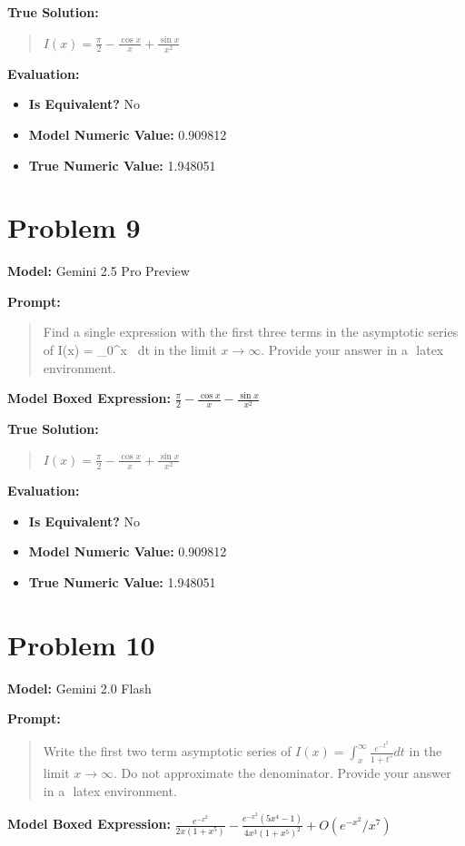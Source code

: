 \documentclass{article}
\begin{document}
\textbf{True Solution:}
\begin{quote}
$I(x)=\frac{\pi}{2} - \frac{\cos x}{x} + \frac{\sin x}{x^2}$
\end{quote}

\textbf{Evaluation:}
\begin{itemize}
\item \textbf{Is Equivalent?} No
\item \textbf{Model Numeric Value:} 0.909812
\item \textbf{True Numeric Value:} 1.948051
\end{itemize}
\vspace{1cm}
\section*{Problem 9}
\textbf{Model:} Gemini 2.5 Pro Preview

\textbf{Prompt:}
\begin{quote}
Find a single expression with the first three terms in the asymptotic series of I(x) = \int\limits_{0}^{x}  \ dt in the limit $x \to \infty$. Provide your answer in a $\boxed{}$ latex environment.
\end{quote}
\textbf{Model Boxed Expression:} $\frac{\pi}{2} - \frac{\cos x}{x} - \frac{\sin x}{x^2}$

\textbf{True Solution:}
\begin{quote}
$I(x)=\frac{\pi}{2} - \frac{\cos x}{x} + \frac{\sin x}{x^2}$
\end{quote}

\textbf{Evaluation:}
\begin{itemize}
\item \textbf{Is Equivalent?} No
\item \textbf{Model Numeric Value:} 0.909812
\item \textbf{True Numeric Value:} 1.948051
\end{itemize}
\vspace{1cm}
\section*{Problem 10}
\textbf{Model:} Gemini 2.0 Flash

\textbf{Prompt:}
\begin{quote}
Write the first two term asymptotic series of $I(x) = \int^\infty_x \frac{e^{-t^2}}{1+t^5} dt$ in the limit $x \rightarrow \infty$. Do not approximate the denominator. Provide your answer in a $\boxed{}$ latex environment.
\end{quote}
\textbf{Model Boxed Expression:} $\frac{e^{-x^2}}{2x(1+x^5)} - \frac{e^{-x^2}(5x^4-1)}{4x^3(1+x^5)^2} + O(e^{-x^2}/x^7)$
\end{document}
